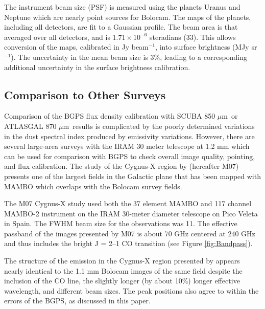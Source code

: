 \documentclass{emulateapj}
\newcommand{\mum}{\ensuremath{\mu \mathrm{m}}}
\newcommand{\bcamfwhm}{33\arcsec}
\begin{document}
The instrument beam size (PSF) is measured using the planets Uranus
and Neptune which are nearly point sources for Bolocam.
The maps of the planets, including all detectors, are fit to a
Gaussian profile.  The beam area is that averaged over all detectors,
and is $1.71\times10^{-6}$ steradians (\bcamfwhm).  This allows
conversion of the maps, calibrated in Jy beam$^{-1}$, into surface
brightness (MJy sr$^{-1}$).  The uncertainty in the mean beam size is
$3\%$, leading to a corresponding additional uncertainty in the
surface brightness calibration.

\subsection{Comparison to Other Surveys}
\label{sec:motte}

Comparison of the BGPS flux density calibration with SCUBA 850 \mum\
or ATLASGAL 870 \mum\ results is complicated by the poorly determined
variations in the dust spectral index produced by emissivity
variations.  However, there are several large-area surveys with the
IRAM 30 meter telescope at 1.2 mm which can be used for comparison
with BGPS to check overall image quality, pointing, and flux
calibration.  The study of the Cygnus-X region by \citet{motte07}
(hereafter M07) presents one of the largest fields in the Galactic
plane that has been mapped with MAMBO which overlaps with the Bolocam
survey fields.

The M07 Cygnus-X study used both the 37 element MAMBO and 117 channel
MAMBO-2 instrument on the IRAM 30-meter diameter telescope on Pico
Veleta in Spain.  The FWHM beam size for the observations was
11\arcsec .  The effective passband of the images presented by M07 is
about 70 GHz centered at 240 GHz and thus includes the bright J = 2--1
CO transition (see Figure \ref{fig:Bandpass}).

The structure of the emission in the Cygnus-X region presented by
\citet{motte07} appears nearly identical to the 1.1 mm Bolocam images
of the same field despite the inclusion of the CO line, the slightly
longer (by about 10\%) longer effective wavelength, and different beam
sizes.  The peak positions also agree to within the errors of the
BGPS, as discussed in this paper.
\end{document}
